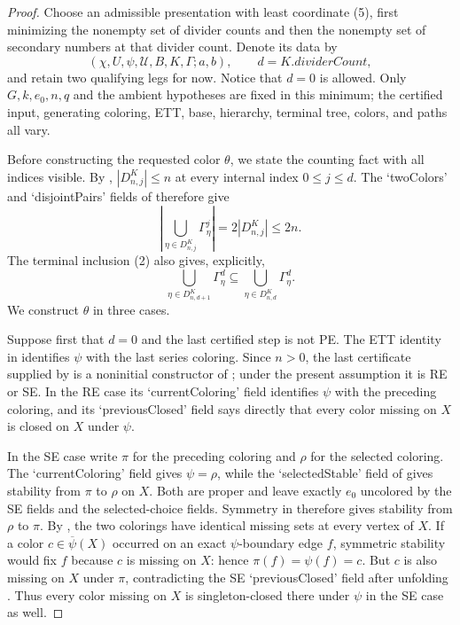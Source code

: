 \begin{proof}
Choose an admissible presentation with least coordinate (5), first
minimizing the nonempty set of divider counts and then the nonempty set of
secondary numbers at that divider count.  Denote its data by
\[
 (\chi,U,\psi,\mathcal U,B,K,\Gamma; a,b),
 \qquad d=K.\mathit{dividerCount},
\]
and retain two qualifying legs for now.  Notice that $d=0$ is allowed.
Only $G,k,e_0,n,q$ and the ambient hypotheses are fixed in this minimum;
the certified input, generating coloring, ETT, base, hierarchy, terminal
tree, colors, and paths all vary.

Before constructing the requested color $\theta$, we state the counting
fact with all indices visible.  By
,
$|D^K_{n,j}|\leq n$ at every internal index $0\leq j\leq d$.
The `twoColors' and `disjointPairs' fields of
 therefore give
\[
 \left|\bigcup_{\eta\in D^K_{n,j}}\Gamma^j_\eta\right|
       =2|D^K_{n,j}|\leq2n.                                  \tag{7}
\]
The terminal inclusion (2) also gives, explicitly,
\[
 \bigcup_{\eta\in D^K_{n,d+1}}\Gamma^d_\eta
 \subseteq
 \bigcup_{\eta\in D^K_{n,d}}\Gamma^d_\eta.                  \tag{8}
\]
We construct $\theta$ in three cases.

Suppose first that $d=0$ and the last certified step is not PE.  The ETT
identity in  identifies $\psi$ with the
last series coloring.  Since $n>0$, the last certificate supplied by
 is a noninitial constructor of
; under the present assumption it is RE or
SE.  In the RE case its `currentColoring' field identifies $\psi$ with
the preceding coloring, and its `previousClosed' field
 says directly that every color missing
on $X$ is closed on $X$ under $\psi$.

In the SE case write $\pi$ for the preceding coloring and $\rho$ for the
selected coloring.  The `currentColoring' field gives $\psi=\rho$, while
the `selectedStable' field of
 gives stability from $\pi$ to $\rho$ on
$X$.  Both are proper and leave exactly $e_0$ uncolored by the SE fields
and the selected-choice fields.  Symmetry in  therefore
gives stability from $\rho$ to $\pi$.  By
, the two colorings have identical missing sets
at every vertex of $X$.  If a color $c\in\overline\psi(X)$ occurred on
an exact $\psi$-boundary edge $f$, symmetric stability would fix $f$
because $c$ is missing on $X$: hence $\pi(f)=\psi(f)=c$.  But $c$ is
also missing on $X$ under $\pi$, contradicting the SE `previousClosed'
field after unfolding .  Thus every color
missing on $X$ is singleton-closed there under $\psi$ in the SE case as
well.


\end{proof}
